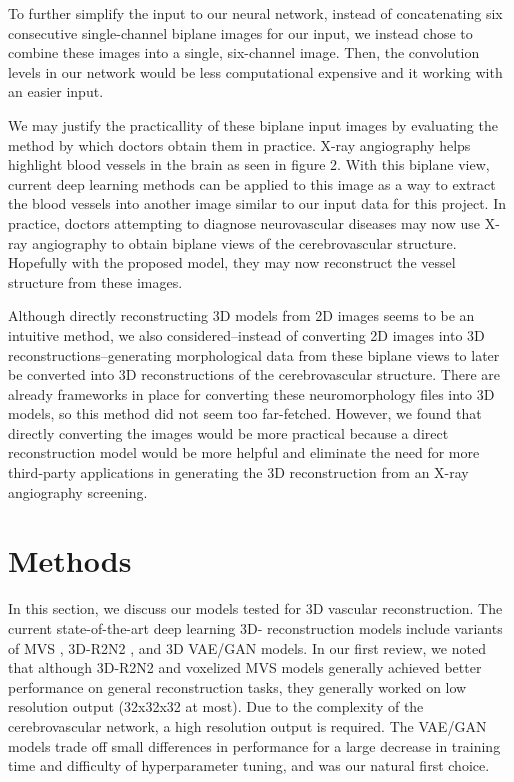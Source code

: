 \documentclass[conference, 10pt]{IEEEtran}
\begin{document}
To further simplify the input to our neural network, instead of concatenating six consecutive single-channel biplane images for our input, we instead chose to combine these images into a single, six-channel image. Then, the convolution levels in our network would be less computational expensive and it working with an easier input.

We may justify the practicallity of these biplane input images by evaluating the method by which doctors obtain them in practice. X-ray angiography helps highlight blood vessels in the brain as seen in figure 2. With this biplane view, current deep learning methods \cite{Angiography Segmentation} can be applied to this image as a way to extract the blood vessels into another image similar to our input data for this project. In practice, doctors attempting to diagnose neurovascular diseases may now use X-ray angiography to obtain biplane views of the cerebrovascular structure. Hopefully with the proposed model, they may now reconstruct the vessel structure from these images.

Although directly reconstructing 3D models from 2D images seems to be an intuitive method, we also considered--instead of converting 2D images into 3D reconstructions--generating morphological data from these biplane views to later be converted into 3D reconstructions of the cerebrovascular structure. There are already frameworks in place for converting these neuromorphology files into 3D models, so this method did not seem too far-fetched. However, we found that directly converting the images would be more practical because a direct reconstruction model would be more helpful and eliminate the need for more third-party applications in generating the 3D reconstruction from an X-ray angiography screening.




\section{Methods}
In this section, we discuss our models tested for 3D vascular reconstruction. The current state-of-the-art deep learning 3D- reconstruction models include variants of MVS \cite{MVS}, 3D-R2N2 \cite{3DLSTM}, and 3D VAE/GAN \cite{VAE/GAN} models. In our first review, we noted that although 3D-R2N2 and voxelized MVS models generally achieved better performance on general reconstruction tasks, they generally worked on low resolution output (32x32x32 at most). Due to the complexity of the cerebrovascular network, a high resolution output is required. The VAE/GAN models trade off small differences in performance for a large decrease in training time and difficulty of hyperparameter tuning, and was our natural first choice.
\end{document}
